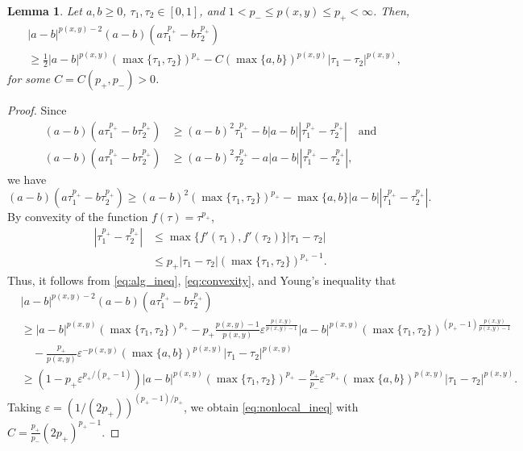 \documentclass[11pt]{amsart}
\theoremstyle{plain}
\newtheorem{lemma}[theorem]{Lemma}
\theoremstyle{definition}
\numberwithin{equation}{section}
\begin{document}
\begin{lemma} \label{lem:nonlocal_ineq}
Let $a, b \geq 0$, $\tau_1, \tau_2 \in [0,1]$, and $1 < p_- \leq p(x,y) \leq p_+ < \infty$. Then,
\begin{equation} \label{eq:nonlocal_ineq}
\begin{split}
&|a-b|^{p(x,y)-2}(a-b) \left( a\tau_1^{p_+} - b\tau_2^{p_+} \right) \\
&\geq \frac{1}{2}|a-b|^{p(x,y)} (\max\lbrace \tau_1,\tau_2 \rbrace)^{p_+} - C(\max\lbrace a,b \rbrace)^{p(x,y)} |\tau_1-\tau_2|^{p(x,y)},
\end{split}
\end{equation}
for some $C = C(p_+, p_-) > 0$.
\end{lemma}

\begin{proof}
Since
\begin{align*}
(a-b)\left( a\tau_1^{p_+}-b\tau_2^{p_+} \right) &\geq (a-b)^2\tau_1^{p_+} - b |a-b| |\tau_1^{p_+}-\tau_2^{p_+}| \quad\text{and} \\
(a-b)\left( a\tau_1^{p_+}-b\tau_2^{p_+} \right) &\geq (a-b)^2\tau_2^{p_+} - a |a-b| |\tau_1^{p_+}-\tau_2^{p_+}|,
\end{align*}
we have
\begin{equation} \label{eq:alg_ineq}
(a-b)\left( a\tau_1^{p_+}-b\tau_2^{p_+} \right) \geq (a-b)^2 (\max\lbrace \tau_1,\tau_2 \rbrace)^{p_+} - \max\lbrace a, b \rbrace |a-b| |\tau_1^{p_+}-\tau_2^{p_+}|.
\end{equation}
By convexity of the function $f(\tau) = \tau^{p_+}$, 
\begin{equation} \label{eq:convexity}
\begin{split}
|\tau_1^{p_+} - \tau_2^{p_+}|
&\leq \max\lbrace f'(\tau_1), f'(\tau_2) \rbrace |\tau_1-\tau_2| \\
&\leq {p_+} |\tau_1-\tau_2| (\max\lbrace \tau_1,\tau_2 \rbrace)^{{p_+}-1}.
\end{split}
\end{equation}
Thus, it follows from \eqref{eq:alg_ineq}, \eqref{eq:convexity}, and Young's inequality that
\begin{align*}
&|a-b|^{p(x,y)-2}(a-b) \left( a\tau_1^{p_+} - b\tau_2^{p_+} \right) \\
&\geq |a-b|^{p(x,y)} (\max\lbrace \tau_1,\tau_2 \rbrace)^{p_+} - p_+ \frac{p(x,y)-1}{p(x,y)} \varepsilon^{\frac{p(x,y)}{p(x,y)-1}} |a-b|^{p(x,y)} (\max\lbrace \tau_1,\tau_2 \rbrace)^{(p_+ -1)\frac{p(x,y)}{p(x,y)-1}} \\
&\quad - \frac{p_+}{p(x,y)} \varepsilon^{-p(x,y)} (\max\lbrace a, b \rbrace)^{p(x,y)} |\tau_1-\tau_2|^{p(x,y)} \\
&\geq \left( 1 - p_+ \varepsilon^{p_+/(p_+-1)} \right) |a-b|^{p(x,y)} (\max\lbrace \tau_1,\tau_2 \rbrace)^{p_+} - \frac{p_+}{p_-}\varepsilon^{-p_+} (\max\lbrace a, b \rbrace)^{p(x,y)} |\tau_1-\tau_2|^{p(x,y)}.
\end{align*}
Taking $\varepsilon = (1/(2p_+))^{(p_+-1)/p_+}$, we obtain \eqref{eq:nonlocal_ineq} with $C = \frac{p_+}{p_-} (2p_+)^{p_+-1}$.
\end{proof}
\end{document}
